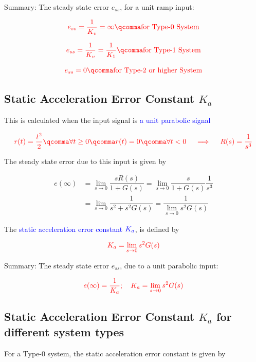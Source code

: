 \documentclass[
  14pt,
  a4paper,
  oneside,
  open=any,
  a4paper,
  14pt]{report}
\begin{document}
Summary: The steady state error \(e_{ss}\), for a unit ramp input:

\[
    \textcolor{red}{e_{ss} = \dfrac{1}{K_v}=\infty\qcomma \text{for Type-0 System}}
\]

\[
    \textcolor{red}{e_{ss} = \dfrac{1}{K_v} = \dfrac{1}{K_1}\qcomma \text{for Type-1 System}}
\]

\[
    \textcolor{red}{e_{ss}=0\qcomma \text{for Type-2 or higher System}}
\]

\subsection{\texorpdfstring{Static Acceleration Error Constant
\(K_a\)}{Static Acceleration Error Constant K\_a}}\label{static-acceleration-error-constant-k_a}

This is calculated when the input signal is \textcolor{blue}{a unit
parabolic signal}

\[
    \textcolor{red}{r(t) = \dfrac{t^2}{2}\qcomma \forall t \geq 0\qcomma r(t) = 0\qcomma \forall t < 0 \quad \implies \quad R(s) = \dfrac{1}{s^3}}
\]

The steady state error due to this input is given by

\[
\begin{aligned}
    e(\infty) &= \lim_{s \to 0} \dfrac{sR(s)}{1+G(s)} = \lim_{s \to 0} \dfrac{s}{1+G(s)} \dfrac{1}{s^3} \\
    &= \lim_{s \to 0} \dfrac{1}{s^2+s^2G(s)} = \dfrac{1}{\lim\limits_{s \to 0} s^2G(s)}
\end{aligned}
\]

The \textcolor{blue}{static acceleration error constant}
\(\textcolor{blue}{K_a}\), is defined by

\[
    \textcolor{red}{K_a = \lim_{s \to 0} s^2 G(s)}
\]

Summary: The steady state error \(e_{ss}\), due to a unit parabolic
input:

\[
    \textcolor{red}{e(\infty) = \dfrac{1}{K_a}; \quad K_a = \lim_{s \to 0} s^2G(s)}
\]

\subsection{\texorpdfstring{Static Acceleration Error Constant \(K_a\)
for different system
types}{Static Acceleration Error Constant K\_a for different system types}}\label{static-acceleration-error-constant-k_a-for-different-system-types}

For a Type-0 system, the static acceleration error constant is given by
\end{document}
